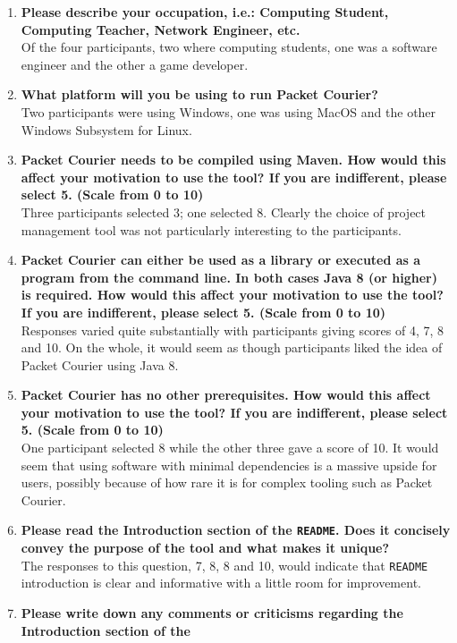 \begin{enumerate}
    \item \textbf{Please describe your occupation, i.e.: Computing Student, Computing Teacher, Network Engineer,
        etc.} \\
    Of the four participants, two where computing students, one was a software engineer and the other a game developer.
    \item \textbf{What platform will you be using to run Packet Courier?} \\
    Two participants were using Windows, one was using MacOS and the other Windows Subsystem for Linux.
    \item \textbf{Packet Courier needs to be compiled using Maven. How would this affect your motivation to use the
    tool? If you are indifferent, please select 5. (Scale from 0 to 10)} \\
    Three participants selected 3; one selected 8. Clearly the choice of project management tool was not particularly
    interesting to the participants.
    \item \textbf{Packet Courier can either be used as a library or executed as a program from the command line. In
    both cases Java 8 (or higher) is required. How would this affect your motivation to use the tool? If you are
    indifferent, please select 5. (Scale from 0 to 10)} \\
    Responses varied quite substantially with participants giving scores of 4, 7, 8 and 10. On the whole, it would
    seem as though participants liked the idea of Packet Courier using Java 8.
    \item \textbf{Packet Courier has no other prerequisites. How would this affect your motivation to use the tool?
    If you are indifferent, please select 5. (Scale from 0 to 10)} \\
    One participant selected 8 while the other three gave a score of 10. It would seem that using software with
    minimal dependencies is a massive upside for users, possibly because of how rare it is for complex tooling such
    as Packet Courier.
    \item \textbf{Please read the Introduction section of the \texttt{README}. Does it concisely convey the purpose
    of the tool and what makes it unique?} \\
    The responses to this question, 7, 8, 8 and 10, would indicate that \texttt{README} introduction is clear and
    informative with a little room for improvement.
    \item \textbf{Please write down any comments or criticisms regarding the Introduction section of the
}
\end{enumerate}
